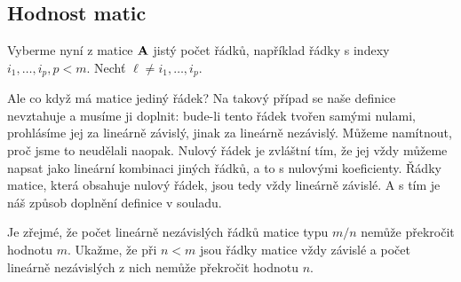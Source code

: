    \subsection{Hodnost matic}\label{mai:IchapIIsecIIIsubII}
      Vyberme nyní z matice \(\mathbf{A}\) jistý počet řádků, například řádky s indexy \(i_1, \ldots, 
      i_p, p < m\). Nechť \(\ell \neq i_1, \ldots, i_p\).

      
      Ale co když má matice jediný řádek? Na takový případ se naše definice nevztahuje a musíme ji 
      doplnit: bude-li tento řádek tvořen samými nulami, prohlásíme jej za lineárně závislý, jinak 
      za lineárně nezávislý. Můžeme namítnout, proč jsme to neudělali naopak. Nulový řádek je 
      zvláštní tím, že jej vždy můžeme napsat jako lineární kombinaci jiných řádků, a to s nulovými 
      koeficienty. Řádky matice, která obsahuje nulový řádek, jsou tedy vždy lineárně závislé. A s 
      tím je náš způsob doplnění definice v souladu. 
      
      Je zřejmé, že počet lineárně nezávislých řádků matice typu \(m/n\) nemůže překročit hodnotu 
      \(m\). Ukažme, že při \(n < m\) jsou řádky matice vždy závislé a počet lineárně nezávislých z 
      nich nemůže překročit hodnotu \(n\).
      
